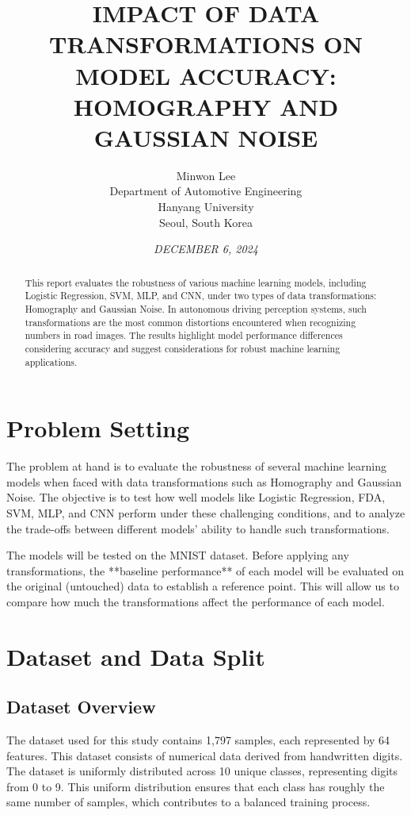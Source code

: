 \documentclass{article}
\title{\textbf{\MakeUppercase{Impact of Data Transformations on Model Accuracy:}\\ \MakeUppercase{Homography and Gaussian Noise}}}  %
\author{
    Minwon Lee \\  %
    Department of Automotive Engineering \\  %
    Hanyang University \\  %
    Seoul, South Korea  %
}
\date{\textit{\MakeUppercase{December 6, 2024}}}  %
\begin{document}
\maketitle  %

\begin{abstract}  
    This report evaluates the robustness of various machine learning models, 
    including Logistic Regression, SVM, MLP, and CNN, under two types of data transformations: Homography and Gaussian Noise. 
    In autonomous driving perception systems, such transformations are the most common distortions encountered when recognizing numbers in road images.
    The results highlight model performance differences considering accuracy and suggest considerations for robust machine learning applications. 
\end{abstract}

\section{Problem Setting}
The problem at hand is to evaluate the robustness of several machine learning models when faced with data transformations such as Homography and Gaussian Noise. The objective is to test how well models like Logistic Regression, FDA, SVM, MLP, and CNN perform under these challenging conditions, and to analyze the trade-offs between different models' ability to handle such transformations.

The models will be tested on the MNIST dataset. Before applying any transformations, the **baseline performance** of each model will be evaluated on the original (untouched) data to establish a reference point. This will allow us to compare how much the transformations affect the performance of each model.

\section{Dataset and Data Split}

\subsection{Dataset Overview}
The dataset used for this study contains 1,797 samples, each represented by 64 features. This dataset consists of numerical data derived from handwritten digits. The dataset is uniformly distributed across 10 unique classes, representing digits from 0 to 9. This uniform distribution ensures that each class has roughly the same number of samples, which contributes to a balanced training process.
\end{document}
